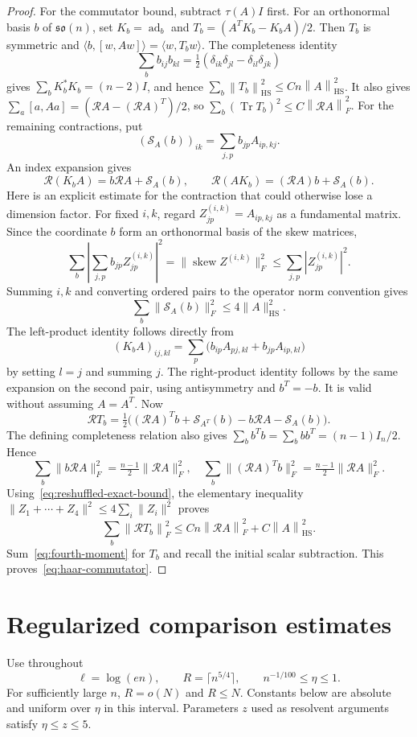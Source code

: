 \documentclass[11pt]{article}
\theoremstyle{definition}\newtheorem{definition}[theorem]{Definition}
\theoremstyle{remark}\newtheorem{remark}[theorem]{Remark}
\DeclareMathOperator{\Tr}{Tr}
\DeclareMathOperator{\ad}{ad}
\newcommand{\g}{\mathfrak{so}(n)}
\newcommand{\R}{\mathcal R}
\newcommand{\HS}{\mathrm{HS}}
\newcommand{\ip}[2]{\langle#1,#2\rangle}
\newcommand{\norm}[1]{\left\lVert#1\right\rVert}
\begin{document}
\begin{proof}
For the commutator bound, subtract $\tau(A)I$ first. For an orthonormal basis $b$ of $\g$, set $K_b=\ad_b$ and
$T_b=(A^TK_b-K_bA)/2$.
Then $T_b$ is symmetric and $\ip b{[w,Aw]}=\ip w{T_bw}$.
The completeness identity
\[
 \sum_b b_{ij}b_{kl}=\tfrac12(\delta_{ik}\delta_{jl}-\delta_{il}\delta_{jk})
\]
gives $\sum_b K_b^*K_b=(n-2)I$, and hence
$\sum_b\norm{T_b}_{\HS}^2\le Cn\norm A_{\HS}^2$.
It also gives
$\sum_a[a,Aa]=(\R A-(\R A)^T)/2$, so
$\sum_b(\Tr T_b)^2\le C\norm{\R A}_F^2$.
For the remaining contractions, put
\[
 (\mathcal S_A(b))_{ik}=\sum_{j,p}b_{jp}A_{ip,kj}.
\]
An index expansion gives
\[
 \R(K_bA)=b\R A+\mathcal S_A(b),\qquad
 \R(AK_b)=(\R A)b+\mathcal S_A(b).
\]
Here is an explicit estimate for the contraction that could otherwise lose a dimension factor. For fixed $i,k$, regard $Z^{(i,k)}_{jp}=A_{ip,kj}$ as a fundamental matrix. Since the coordinate $b$ form an orthonormal basis of the skew matrices,
\[
 \sum_b\left|\sum_{j,p}b_{jp}Z^{(i,k)}_{jp}\right|^2
 =\|\operatorname{skew}Z^{(i,k)}\|_F^2
 \le\sum_{j,p}|Z^{(i,k)}_{jp}|^2.
\]
Summing $i,k$ and converting ordered pairs to the operator norm convention gives
\begin{equation}\label{eq:reshuffled-exact-bound}
 \sum_b\|\mathcal S_A(b)\|_F^2\le4\|A\|_{\HS}^2.
\end{equation}
The left-product identity follows directly from
\[
 (K_bA)_{ij,kl}=\sum_p\bigl(b_{ip}A_{pj,kl}+b_{jp}A_{ip,kl}\bigr)
\]
by setting $l=j$ and summing $j$. The right-product identity follows by the same expansion on the second pair, using antisymmetry and $b^T=-b$. It is valid without assuming $A=A^T$.
Now
\[
 \R T_b=\tfrac12\bigl((\R A)^Tb+\mathcal S_{A^T}(b)
                     -b\R A-\mathcal S_A(b)\bigr).
\]
The defining completeness relation also gives
$\sum_b b^Tb=\sum_bbb^T=(n-1)I_n/2$. Hence
\[
 \sum_b\|b\R A\|_F^2=\tfrac{n-1}{2}\|\R A\|_F^2,
 \quad
 \sum_b\|(\R A)^Tb\|_F^2=\tfrac{n-1}{2}\|\R A\|_F^2.
\]
Using~\eqref{eq:reshuffled-exact-bound}, the elementary inequality
$\|Z_1+\cdots+Z_4\|^2\le4\sum_i\|Z_i\|^2$ proves
\begin{equation}\label{eq:partial-Tb-detailed}
 \sum_b\norm{\R T_b}_F^2\le Cn\norm{\R A}_F^2+C\norm A_{\HS}^2.
\end{equation}
Sum~\eqref{eq:fourth-moment} for $T_b$ and recall the initial scalar subtraction. This proves~\eqref{eq:haar-commutator}.
\end{proof}

\section{Regularized comparison estimates}\label{sec:comparison}
Use throughout
\begin{equation}\label{eq:parameters}
 \ell=\log(en),\qquad R=\lceil n^{5/4}\rceil,\qquad
 n^{-1/100}\le\eta\le1.
\end{equation}
For sufficiently large $n$, $R=o(N)$ and $R\le N$. Constants below are absolute and uniform over $\eta$ in this interval. Parameters $z$ used as resolvent arguments satisfy $\eta\le z\le5$.
\end{document}
